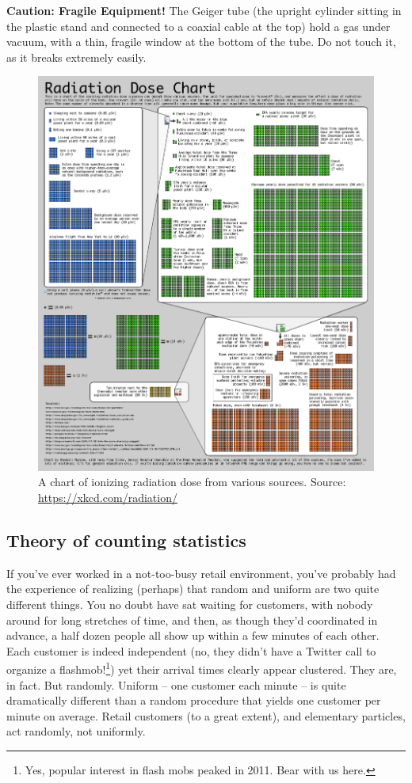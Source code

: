 \begin{framed}
	\textbf{Caution: Fragile Equipment!} The Geiger tube (the upright cylinder sitting in the plastic stand and connected to a coaxial cable at the top) hold a gas under vacuum, with a thin, fragile window at the bottom of the tube. Do not touch it, as it breaks extremely easily.
\end{framed}

\begin{figure}
	\centering
	\includegraphics[width=\textwidth]{radioactivity-1/radiation-xkcd}
	\caption{A chart of ionizing radiation dose from various sources. Source: \url{https://xkcd.com/radiation/}}\label{rad1:doses}
\end{figure}

\subsection{Theory of counting statistics}

If you've ever worked in a not-too-busy retail environment, you’ve probably had the
experience of realizing (perhaps) that random and uniform are two quite different things.
You no doubt have sat waiting for customers, with nobody around for long stretches of
time, and then, as though they'd coordinated in advance, a half dozen people all show up
within a few minutes of each other. Each customer is indeed independent (no, they didn't
have a Twitter call to organize a flashmob!\footnote{Yes, popular interest in flash mobs peaked in 2011. Bear with us here.}) yet their arrival times clearly appear clustered. They are, in fact. But randomly. Uniform – one customer each minute – is quite dramatically different than a random procedure that yields one customer per minute on average. Retail customers (to a great extent), and elementary particles, act randomly, not uniformly.

